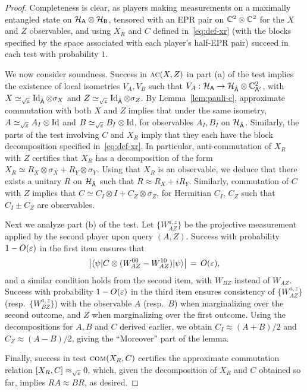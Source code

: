 \begin{proof}
Completeness is clear, as players making measurements on a maximally entangled state on $\mathcal{H}_{{\textsf{A}}}\otimes \mathcal{H}_{{\textsf{B}}}$, tensored with an EPR pair on $\mathbb{C}^2 \otimes \mathbb{C}^2$ for the $X$ and $Z$ observables, and using $X_R$ and $C$ defined in~\eqref{eq:def-xr} (with the blocks specified by the space associated with each player's half-EPR pair) succeed in each test with probability $1$. 

We now consider soundness. Success in $\textsc{ac}(X,Z)$ in part (a) of the test implies the existence of local isometries $V_A,V_B$ such that $V_A:\mathcal{H}_{\textsf{A}}\to \mathcal{H}_{\hat{{\textsf{A}}}}\otimes \mathbb{C}^2_{{\textsf{A}}'}$, with $X\simeq_{\sqrt{\varepsilon}} \mathop{\rm Id}\nolimits_{\hat{{\textsf{A}}}}\otimes \sigma_X$ and $Z\simeq_{\sqrt{\varepsilon}} \mathop{\rm Id}\nolimits_{\hat{{\textsf{A}}}}\otimes\sigma_Z$. By Lemma~\ref{lem:pauli-c}, approximate commutation with both $X$ and $Z$ implies that under the same isometry, $A\simeq_{\sqrt{\varepsilon}} A_I \otimes \mathop{\rm Id}\nolimits$ and $B\simeq_{\sqrt{\varepsilon}} B_I \otimes \mathop{\rm Id}\nolimits$, for observables $A_I, B_I$ on $\mathcal{H}_{\hat{{\textsf{A}}}}$. Similarly, the parts of the test involving $C$ and $X_R$ imply that they each have the block decomposition specified in~\eqref{eq:def-xr}. 
In particular,  anti-commutation of $X_R$ with $Z$ certifies that $X_R$ has  a decomposition of the form  $X_R \simeq R_X \otimes \sigma_X + R_Y \otimes \sigma_Y$. Using that $X_R$ is an observable, we deduce that there exists a unitary $R$ on $\mathcal{H}_{\hat{{\textsf{A}}}}$ such that $R \approx R_X + i R_Y$. Similarly, commutation of $C$ with $Z$ implies that $C \simeq C_I \otimes I + C_Z \otimes \sigma_Z$, for Hermitian $C_I$, $C_Z$ such that $C_I \pm C_Z$ are observables. 



Next we analyze part (b) of the test. Let $\{W_{AZ}^{a,z}\}$ be the projective measurement applied by the second player upon query $(A,Z)$. Success with probability $1-O(\varepsilon)$ in the first item ensures that 
$$\big| \langle\psi| C \otimes (W_{AZ}^{00} - W_{AZ}^{10})|\psi\rangle \big| \,=\,O(\varepsilon),$$
and a similar condition holds from the second item, with $W_{BZ}$ instead of $W_{AZ}$. Success with probability $1-O(\varepsilon)$ in the third item ensures consistency of $\{W_{AZ}^{a,z}\}$ (resp.\ $\{W_{BZ}^{a,z}\}$) with the observable $A$ (resp.\ $B$) when marginalizing over the second outcome, and $Z$ when marginalizing over the first outcome. Using the decompositions for $A,B$ and $C$ derived earlier, we obtain $C_I \approx (A+B)/2$ and $C_Z \approx (A-B)/2$, giving the ``Moreover'' part of the lemma. 

Finally, success in test $\textsc{com}(X_R,C)$ certifies the approximate commutation relation $[X_R,C]\approx_{\sqrt{\varepsilon}} 0$, which, given the decomposition of $X_R$ and $C$ obtained so far, implies $RA \approx B R$, as desired. 
\end{proof}



